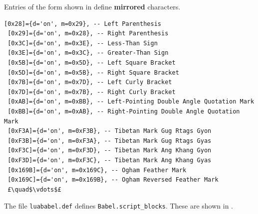 \documentclass[12pt, twoside]{article}
\begin{document}
Entries of the form shown in  define \textbf{mirrored} characters.

\begin{lstlisting}[language={[5.2]Lua},  escapechar=£, caption={Some of the matching delimiters in Babel table of characters (with added comments)}, label=lst:BabelTableChractersMachedDelimiters]
 [0x28]={d='on', m=0x29}, -- Left Parenthesis
 [0x29]={d='on', m=0x28}, -- Right Parenthesis
 [0x3C]={d='on', m=0x3E}, -- Less-Than Sign
 [0x3E]={d='on', m=0x3C}, -- Greater-Than Sign
 [0x5B]={d='on', m=0x5D}, -- Left Square Bracket
 [0x5D]={d='on', m=0x5B}, -- Right Square Bracket
 [0x7B]={d='on', m=0x7D}, -- Left Curly Bracket
 [0x7D]={d='on', m=0x7B}, -- Right Curly Bracket
 [0xAB]={d='on', m=0xBB}, -- Left-Pointing Double Angle Quotation Mark
 [0xBB]={d='on', m=0xAB}, -- Right-Pointing Double Angle Quotation Mark
 [0xF3A]={d='on', m=0xF3B}, -- Tibetan Mark Gug Rtags Gyon
 [0xF3B]={d='on', m=0xF3A}, -- Tibetan Mark Gug Rtags Gyas
 [0xF3C]={d='on', m=0xF3D}, -- Tibetan Mark Ang Khang Gyon
 [0xF3D]={d='on', m=0xF3C}, -- Tibetan Mark Ang Khang Gyas
 [0x169B]={d='on', m=0x169C}, -- Ogham Feather Mark
 [0x169C]={d='on', m=0x169B}, -- Ogham Reversed Feather Mark
 £\quad$\vdots$£
\end{lstlisting}

The file \texttt{luababel.def} defines \texttt{Babel.script\_blocks}. These are shown in .
\end{document}

